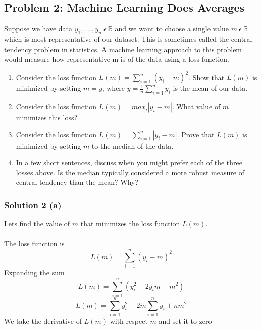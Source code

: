 \documentclass{assignment}
\begin{document}
\begin{problem}

\section{Problem 2: Machine Learning Does Averages}

\noindent 
Suppose we have data $y_1,....,y_n \ \epsilon\ \mathbb{R}$ and we want to choose a single value $m\ \epsilon\ \mathbb{R}$ which is most representative of our dataset. This is sometimes called the central tendency problem in statistics. A machine learning approach to this problem would measure how representative m is of the data using a loss function.

\begin{enumerate}[label=(\alph*)]
\item Consider the loss function $L(m) = \sum_{i=1}^{n}(y_i-m)^2$. Show that $L(m)$ is minimized by setting $m = \bar{y}$, where $\bar{y} = \frac{1}{n}\sum_{i=1}^{n}y_i$ is the mean of our data.

\item Consider the loss function $L(m) = max_i|y_i-m|$. What value of $m$ minimizes this loss?

\item Consider the loss function $L(m) = \sum_{i=1}^{n}|y_i-m|$. Prove that $L(m)$ is minimized by setting $m$ to the median of the data.

\item In a few short sentences, discuss when you might prefer each of the three losses above. Is the median typically considered a more robust measure of central tendency than the mean? Why?

\end{enumerate}

\subsubsection*{Solution 2 (a)}

\noindent Lets find the value of $m$ that minimizes the loss function $L(m)$. 
\\
\\
The loss function is
\begin{equation}
    L(m) = \sum_{i=1}^{n}(y_i-m)^2
\end{equation}
Expanding the sum
\begin{equation}
    L(m) = \sum_{i=1}^{n}(y_i^2-2y_im+m^2)
\end{equation}
\begin{equation}
    L(m) = \sum_{i=1}^{n}y_i^2- 2m\sum_{i=1}^{n}y_i+nm^2
\end{equation}
We take the derivative of $L(m)$ with respect $m$ and set it to zero


\end{problem}
\end{document}
